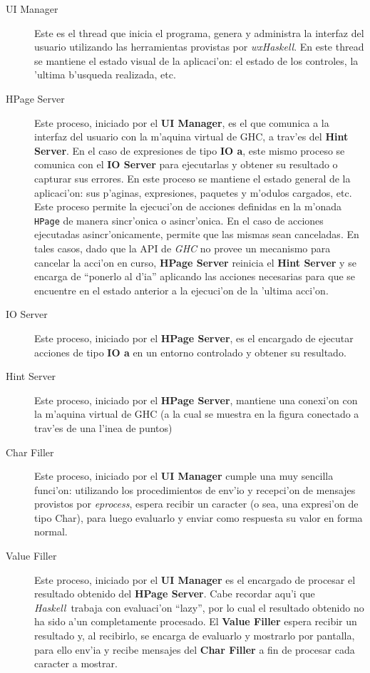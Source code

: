 \documentclass[a4paper]{article}
\newcommand{\haskell}{\textsl{Haskell}}
\begin{document}
\begin{description}
	\item[UI Manager] Este es el thread que inicia el programa, genera y administra la interfaz del usuario utilizando las herramientas provistas por \textsl{wxHaskell}.  En este thread se mantiene el estado visual de la aplicaci'on: el estado de los controles, la 'ultima b'usqueda realizada, etc.
	\item[HPage Server] Este proceso, iniciado por el \textbf{UI Manager}, es el que comunica a la interfaz del usuario con la m'aquina virtual de GHC, a trav'es del \textbf{Hint Server}.  En el caso de expresiones de tipo \textbf{IO a}, este mismo proceso se comunica con el \textbf{IO Server} para ejecutarlas y obtener su resultado o capturar sus errores.  En este proceso se mantiene el estado general de la aplicaci'on: sus p'aginas, expresiones, paquetes y m'odulos cargados, etc.  Este proceso permite la ejecuci'on de acciones definidas en la m'onada \texttt{HPage} de manera sincr'onica o asincr'onica.  En el caso de acciones ejecutadas asincr'onicamente, permite que las mismas sean canceladas.  En tales casos, dado que la API de \textsl{GHC} no provee un mecanismo para cancelar la acci'on en curso, \textbf{HPage Server} reinicia el \textbf{Hint Server} y se encarga de ``ponerlo al d'ia'' aplicando las acciones necesarias para que se encuentre en el estado anterior a la ejecuci'on de la 'ultima acci'on.
	\item[IO Server]Este proceso, iniciado por el  \textbf{HPage Server}, es el encargado de ejecutar acciones de tipo \textbf{IO a} en un entorno controlado y obtener su resultado.
	\item[Hint Server] Este proceso, iniciado por el \textbf{HPage Server}, mantiene una conexi'on con la m'aquina virtual de GHC (a la cual se muestra en la figura conectado a trav'es de una l'inea de puntos)
	\item[Char Filler] Este proceso, iniciado por el \textbf{UI Manager} cumple una muy sencilla funci'on: utilizando los procedimientos de env'io y recepci'on de mensajes provistos por \textsl{eprocess}, espera recibir un caracter (o sea, una expresi'on de tipo Char), para luego evaluarlo y enviar como respuesta su valor en forma normal.
	\item[Value Filler] Este proceso, iniciado por el \textbf{UI Manager} es el encargado de procesar el resultado obtenido del \textbf{HPage Server}.  Cabe recordar aqu'i que \haskell\ trabaja con evaluaci'on ``lazy'', por lo cual el resultado obtenido no ha sido a'un completamente procesado.  El \textbf{Value Filler} espera recibir un resultado y, al recibirlo, se encarga de evaluarlo y mostrarlo por pantalla, para ello env'ia y recibe mensajes del \textbf{Char Filler} a fin de procesar cada caracter a mostrar.

\end{description}
\end{document}
